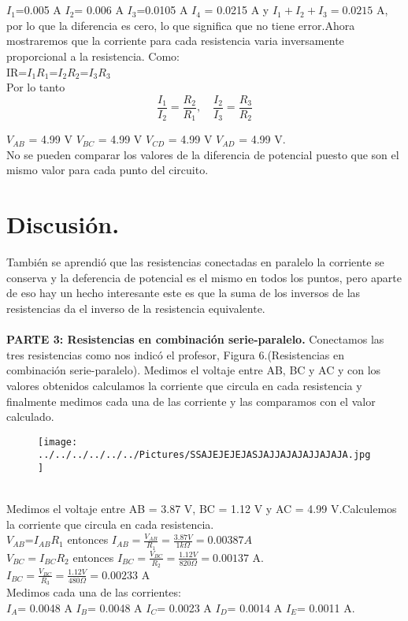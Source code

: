 \documentclass[11pt,a4paper]{article}
\begin{document}
\\
\\
${I}_{1}$=0.005 A   ${I}_{2}$= 0.006  A    ${I}_{3}$=0.0105  A   ${I}_{4}$ = 0.0215 A  y  ${I}_{1} + {I}_{2} + {I}_{3}= 0.0215$ A, por lo que la diferencia es cero, lo que significa que no tiene error.Ahora mostraremos que la corriente para cada resistencia varia inversamente proporcional a la resistencia. Como:
\\
IR=${I}_{1} {R}_{1}$=${I}_{2} {R}_{2}$=${I}_{3} {R}_{3}$
\\
Por lo tanto
\[ \frac{{I}_{1}}{{I}_{2}} = \frac{{R}_{2}}{{R}_{1}}, \quad \frac{{I}_{2}}{{I}_{3}}= \frac{{R}_{3}}{{R}_{2}} \]
   
${V}_{AB}$ = 4.99 V ${V}_{BC}$ = 4.99 V  ${V}_{CD}$ = 4.99 V  ${V}_{AD}$ = 4.99 V.
\\
No se pueden comparar los valores de la diferencia de potencial puesto que son el mismo valor para cada punto del circuito.
\section*{Discusi\'{o}n.}
Tambi\'{e}n se aprendi\'{o} que las resistencias conectadas en paralelo la corriente se conserva y la deferencia de potencial es el mismo en todos los puntos, pero aparte de eso hay un hecho interesante este es que la suma de los inversos de las resistencias da el inverso de la resistencia equivalente.
\\
\\
\textbf{PARTE 3: Resistencias en combinaci\'{o}n serie-paralelo.} Conectamos las tres resistencias como nos indic\'{o} el profesor, Figura 6.(Resistencias en combinaci\'{o}n serie-paralelo). Medimos el voltaje entre AB, BC y AC y con los valores obtenidos calculamos la  corriente que circula en cada resistencia y finalmente medimos cada una de las corriente y las comparamos con el valor calculado.
\begin{figure}[hbtp]
 \centering
 \texttt{[image: ../../../../../../Pictures/SSAJEJEJEJASJAJJAJAJAJJAJAJA.jpg]}
 \end{figure}
\\
Medimos el voltaje entre AB = 3.87 V, BC = 1.12 V y AC = 4.99 V.Calculemos la corriente que circula en cada resistencia.
\\
${V}_{AB}$=${I}_{AB} {R}_{1}$ entonces ${I}_{AB}= \frac{{V}_{AB}}{{R}_{1}}= \frac{3.87 V}{1 k \Omega} = 0.00387 A$
\\
${V}_{BC} = {I}_{BC}{R}_{2}$ entonces ${I}_{BC} = \frac{{V}_{BC}}{{R}_{2}} = \frac{1.12 V}{820 \Omega}= 0.00137$ A.
\\
${I}_{BC} = \frac{V_{BC}}{{R}_{3}} = \frac{1.12 V}{480\Omega} = 0.00233$ A
 \\
Medimos cada una de las corrientes:
\\ 
${I}_{A}$= 0.0048 A ${I}_{B}$= 0.0048 A	${I}_{C}$= 0.0023 A	${I}_{D}$= 0.0014 A	${I}_{E}$= 0.0011 A.
\end{document}
